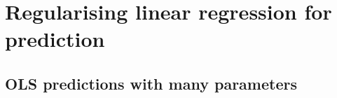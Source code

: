 \chapter{Regularising linear regression for prediction}
\section{OLS predictions with many parameters}

